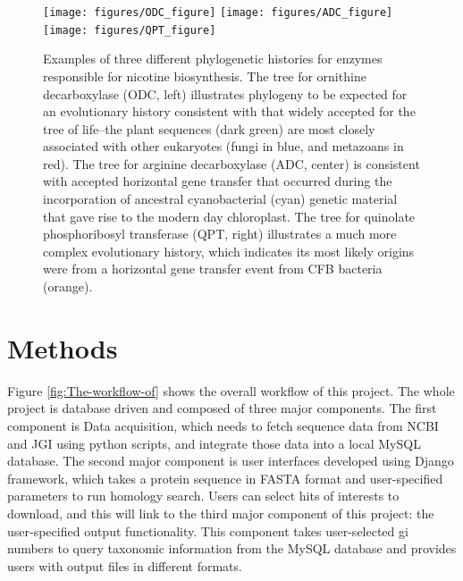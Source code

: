 \documentclass[11pt,letterpaper,twoside,english]{article}
\begin{document}
\begin{figure}[htbp]
    \begin{center}
        \texttt{[image: figures/ODC\_figure]}
        \texttt{[image: figures/ADC\_figure]}
        \texttt{[image: figures/QPT\_figure]}
    \end{center}
    \caption{Examples of three different phylogenetic histories for enzymes
    responsible for nicotine biosynthesis. The tree for ornithine
    decarboxylase (ODC, left) illustrates phylogeny to be expected for an
    evolutionary history consistent with that widely accepted for the tree of
    life--the plant sequences (dark green) are most closely associated with
    other eukaryotes (fungi in blue, and metazoans in red). The tree for
    arginine decarboxylase (ADC, center) is consistent with accepted
    horizontal gene transfer that occurred during the incorporation of
    ancestral cyanobacterial (cyan) genetic material that gave rise to the
    modern day chloroplast. The tree for quinolate phosphoribosyl transferase
    (QPT, right) illustrates a much more complex evolutionary history, which
    indicates its most likely origins were from a horizontal gene transfer
    event from CFB bacteria (orange).}
    \label{fig:phylo_histories}
\end{figure}


\section{Methods}

Figure \ref{fig:The-workflow-of} shows the overall workflow of this
project. The whole project is database driven and composed of three
major components. The first component is Data acquisition, which needs
to fetch sequence data from NCBI and JGI using python scripts, and
integrate those data into a local MySQL database. The second major
component is user interfaces developed using Django framework, which
takes a protein sequence in FASTA format and user-specified parameters
to run homology search. Users can select hits of interests to download,
and this will link to the third major component of this project: the
user-specified output functionality. This component takes user-selected
gi numbers to query taxonomic information from the MySQL database
and provides users with output files in different formats.
\end{document}
